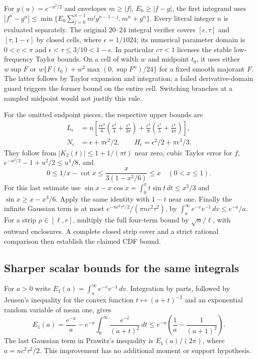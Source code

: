 For $g(u)=e^{-u^2/2}$ and envelopes $m\ge|f|$, $E_0\ge|f-g|$,
the first integrand uses
$|f^n-g^n|\le\min\{E_0\sum_{j=0}^{n-1}m^jg^{n-1-j},m^n+g^n\}$.
Every literal integer $n$ is evaluated separately. The original $20$--$24$ integral verifier
covers $[\epsilon,\tau]$ and $[\tau,1-\epsilon]$ by closed cells,
where $\epsilon=1/1024$; its numerical parameter domain is
$0<c<\pi$ and $\epsilon<\tau\le3/10<1-\epsilon$.
In particular $c\tau<1$ licenses the stable low-frequency Taylor bounds.
On a cell of width $w$ and midpoint $t_0$,
it uses either $w\sup F$ or
$w\{F(t_0)+w^2\max(0,\sup F'')/24\}$ for a fixed smooth majorant
$F$. The latter follows by Taylor expansion and integration; a failed
derivative-domain guard triggers the former bound on the entire cell.
Switching branches at a sampled midpoint would not justify this rule.

For the omitted endpoint pieces, the respective upper bounds are
\begin{align*}
 L_\epsilon&=n\left[
 \frac{rc^3}{6}\left(\frac{\epsilon^4}{4}
       +\frac{\epsilon^3}{3\pi}\right)
 +\frac{c^4}{8}\left(\frac{\epsilon^5}{5}
       +\frac{\epsilon^4}{4\pi}\right)\right],\\
 N_\epsilon&=\epsilon+\pi\epsilon^2/2,\qquad
 H_\epsilon=\epsilon^2/2+\pi\epsilon^3/3.
\end{align*}
They follow from $|K_2(t)|\le1+1/(\pi t)$ near zero, cubic Taylor
error for $f$, $e^{-u^2/2}-1+u^2/2\le u^4/8$, and
\[
 0\le1/x-\cot x\le\frac{x}{3(1-x^2/6)}\le x\quad(0<x\le1).
\]
For this last estimate use
$\sin x-x\cos x=\int_0^x t\sin t\,dt\le x^3/3$ and
$\sin x\ge x-x^3/6$. Apply the same identity with $1-t$ near one.
Finally the infinite Gaussian term is at most
$e^{-nc^2\tau^2/2}/(\pi nc^2\tau^2)$, by
$\int_a^\infty e^{-v}v^{-1}\,dv\le e^{-a}/a$.
For a strip $\rho\in[\ell,r]$, multiply the full four-term bound by
$\sqrt n/\ell$, with outward enclosures. A complete closed strip cover
and a strict rational comparison then establish the claimed CDF bound.


\subsection{Sharper scalar bounds for the same integrals}
\label{ext:finite-fourier-scalars}
For $a>0$ write $E_1(a)=\int_a^\infty e^{-v}v^{-1}\,dv$.
Integration by parts, followed by Jensen's inequality for the convex
function $t\mapsto(a+t)^{-2}$ and an exponential random variable of mean
one, gives
\[
 E_1(a)=\frac{e^{-a}}a-e^{-a}\int_0^\infty
                \frac{e^{-t}}{(a+t)^2}\,dt
 \le e^{-a}\left(\frac1a-\frac1{(a+1)^2}\right).
\]
The last Gaussian term in Prawitz's inequality is $E_1(a)/(2\pi)$,
where $a=nc^2\tau^2/2$. This improvement has no additional moment or
support hypothesis.


